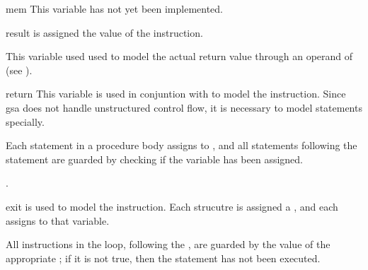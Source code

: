 \begin{variable}{mem}
  This variable has not yet been implemented.
\end{variable}

\begin{variable}{result}
   is assigned the value of the 
  instruction.

  This variable used used to model the actual return value through an
  operand of  (see ).
\end{variable}

\begin{variable}{return}
  This variable is used in conjuntion with  to model
  the  instruction.  Since \ac{gsa} does not handle
  unstructured control flow, it is necessary to model 
  statements specially.

  Each  statement in a procedure body assigns to
  , and all statements following the 
  statement are guarded by checking if the variable has been
  assigned.

  .

\end{variable}

\begin{variable}{exit}
   is used to model the  instruction.  Each
   strucutre is assigned a , and each
   assigns to that variable.

  All instructions in the loop, following the , are guarded
  by the value of the appropriate ; if it is not true,
  then the  statement has not been executed.

\end{variable}
